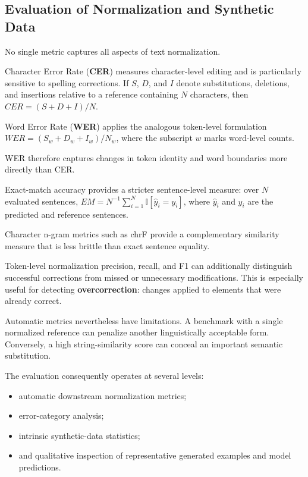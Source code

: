\documentclass[12pt, a4paper, twoside, openany]{report}
\begin{document}
\subsection{Evaluation of Normalization and Synthetic Data}

No single metric captures all aspects of text normalization.

Character Error Rate (\textbf{CER}) measures character-level editing and is particularly sensitive to spelling corrections. If $S$, $D$, and $I$ denote substitutions, deletions, and insertions relative to a reference containing $N$ characters, then $CER=(S+D+I)/N$.

Word Error Rate (\textbf{WER}) applies the analogous token-level formulation $WER=(S_w+D_w+I_w)/N_w$, where the subscript $w$ marks word-level counts.

WER therefore captures changes in token identity and word boundaries more directly than CER.

Exact-match accuracy provides a stricter sentence-level measure: over $N$ evaluated sentences, $EM=N^{-1}\sum_{i=1}^{N}\mathbb{I}[\hat{y}_i=y_i]$, where $\hat{y}_i$ and $y_i$ are the predicted and reference sentences.

Character n-gram metrics such as chrF provide a complementary similarity measure that is less brittle than exact sentence equality.

Token-level normalization precision, recall, and F1 can additionally distinguish successful corrections from missed or unnecessary modifications. This is especially useful for detecting \textbf{overcorrection}: changes applied to elements that were already correct.

Automatic metrics nevertheless have limitations. A benchmark with a single normalized reference can penalize another linguistically acceptable form. Conversely, a high string-similarity score can conceal an important semantic substitution.

The evaluation consequently operates at several levels:

\begin{itemize}
	\item automatic downstream normalization metrics;
	\item error-category analysis;
	\item intrinsic synthetic-data statistics;
	\item and qualitative inspection of representative generated examples and model predictions.
\end{itemize}
\end{document}
